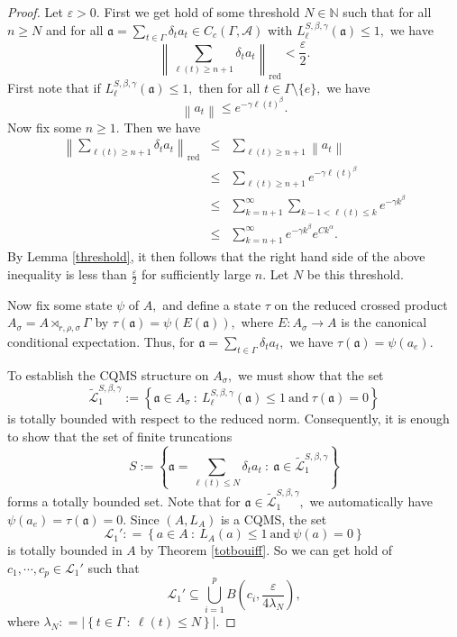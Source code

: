 \documentclass[10pt,a4paper]{amsart}
\newcommand{\Bea}{\begin{eqnarray*}}
\newcommand{\Eea}{\end{eqnarray*}}
\begin{document}
\begin{proof} Let $\varepsilon > 0.$ First we get hold of some threshold $N \in \mathbb N$ such that for all $n \geq N$ and for all $\mathfrak{a} = \sum\limits_{t \in \Gamma} \delta_t a_t \in C_c (\Gamma, \mathcal A)$ with $L_{\ell}^{S, \beta, \gamma} (\mathfrak{a}) \leq 1,$ we have 
$$\left \|\sum\limits_{\ell (t) \geq n + 1} \delta_t a_t \right \|_{\mathrm {red}} < \frac {\varepsilon} {2}.$$
First note that if $L_{\ell}^{S, \beta, \gamma} (\mathfrak{a}) \leq 1,$ then for all $t \in \Gamma \setminus \{e\},$ we have 
$$\left \|a_t \right \| \leq e^{- \gamma \ell (t)^{\beta}}.$$
Now fix some $n \geq 1.$ Then we have
\Bea
\left \|\sum\limits_{\ell (t) \geq n + 1} \delta_t a_t \right \|_{\mathrm {red}} & \leq & \sum\limits_{\ell (t) \geq n + 1} \left \|a_t \right \| \\ 
& \leq & \sum\limits_{\ell (t) \geq n + 1} e^{- \gamma \ell (t)^{\beta}} \\ 
& \leq & \sum\limits_{k = n + 1}^{\infty} \sum\limits_{k - 1 < \ell (t) \leq k} e^{- \gamma k^{\beta}} \\ 
& \leq & \sum\limits_{k = n + 1}^{\infty} e^{- \gamma k^{\beta}} e^{C k^{\alpha}}.
\Eea
By Lemma \ref{threshold}, it then follows that the right hand side of the above inequality is less than $\frac {\varepsilon} {2}$ for sufficiently large $n.$ Let $N$ be this threshold.

\vspace{2mm}

Now fix some state $\psi$ of $A,$ and define a state $\tau$ on the reduced crossed product $A_{\sigma} = A \rtimes_{r, \rho, \sigma} \Gamma$ by $\tau(\mathfrak{a}) = \psi(E(\mathfrak{a})),$ where $E : A_{\sigma} \rightarrow A$ is the canonical conditional expectation. Thus, for $\mathfrak{a} = \sum\limits_{t \in \Gamma} \delta_t a_t,$ we have $\tau(\mathfrak{a}) = \psi (a_e).$

To establish the CQMS structure on $A_{\sigma},$ we must show that the set 
$$\widetilde{\mathcal{L}}_1^{S, \beta, \gamma} := \left \{\mathfrak{a} \in A_{\sigma}\ :\ L_{\ell}^{S, \beta, \gamma} (\mathfrak{a}) \leq 1 \ \mathrm{and}\ \tau(\mathfrak{a}) = 0 \right \}$$ 
is totally bounded with respect to the reduced norm. Consequently, it is enough to show that the set of finite truncations 
$$S := \left \{\mathfrak{a}=\sum\limits_{\ell (t) \leq N} \delta_t a_t\ :\ \mathfrak{a} \in \widetilde{\mathcal{L}}_1^{S, \beta, \gamma} \right \}$$ 
forms a totally bounded set. Note that for $\mathfrak{a} \in \widetilde{\mathcal{L}}_1^{S, \beta, \gamma},$ we automatically have $\psi(a_e) = \tau(\mathfrak{a}) = 0.$
Since $(A, L_A)$ is a CQMS, the set
$$\mathcal L_1' : = \left \{a \in A\ :\ L_A (a) \leq 1\ \mathrm {and}\ \psi (a) = 0 \right \}$$ 
is totally bounded in $A$ by Theorem \ref{totbouiff}. So we can get hold of $c_1, \cdots, c_p \in \mathcal L_1'$ such that 
$$\mathcal L_1' \subseteq \bigcup\limits_{i = 1}^{p} B \left (c_i, \frac {\varepsilon} {4 \lambda_N} \right ),$$ 
where $\lambda_N : = \left \lvert \left \{t \in \Gamma\ :\ \ell (t) \leq N \right \} \right \rvert.$


\end{proof}
\end{document}
